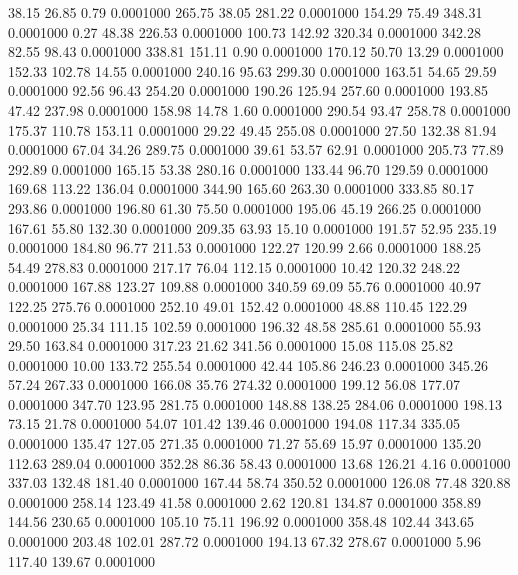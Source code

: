   38.15   26.85    0.79   0.0001000
 265.75   38.05  281.22   0.0001000
 154.29   75.49  348.31   0.0001000
   0.27   48.38  226.53   0.0001000
 100.73  142.92  320.34   0.0001000
 342.28   82.55   98.43   0.0001000
 338.81  151.11    0.90   0.0001000
 170.12   50.70   13.29   0.0001000
 152.33  102.78   14.55   0.0001000
 240.16   95.63  299.30   0.0001000
 163.51   54.65   29.59   0.0001000
  92.56   96.43  254.20   0.0001000
 190.26  125.94  257.60   0.0001000
 193.85   47.42  237.98   0.0001000
 158.98   14.78    1.60   0.0001000
 290.54   93.47  258.78   0.0001000
 175.37  110.78  153.11   0.0001000
  29.22   49.45  255.08   0.0001000
  27.50  132.38   81.94   0.0001000
  67.04   34.26  289.75   0.0001000
  39.61   53.57   62.91   0.0001000
 205.73   77.89  292.89   0.0001000
 165.15   53.38  280.16   0.0001000
 133.44   96.70  129.59   0.0001000
 169.68  113.22  136.04   0.0001000
 344.90  165.60  263.30   0.0001000
 333.85   80.17  293.86   0.0001000
 196.80   61.30   75.50   0.0001000
 195.06   45.19  266.25   0.0001000
 167.61   55.80  132.30   0.0001000
 209.35   63.93   15.10   0.0001000
 191.57   52.95  235.19   0.0001000
 184.80   96.77  211.53   0.0001000
 122.27  120.99    2.66   0.0001000
 188.25   54.49  278.83   0.0001000
 217.17   76.04  112.15   0.0001000
  10.42  120.32  248.22   0.0001000
 167.88  123.27  109.88   0.0001000
 340.59   69.09   55.76   0.0001000
  40.97  122.25  275.76   0.0001000
 252.10   49.01  152.42   0.0001000
  48.88  110.45  122.29   0.0001000
  25.34  111.15  102.59   0.0001000
 196.32   48.58  285.61   0.0001000
  55.93   29.50  163.84   0.0001000
 317.23   21.62  341.56   0.0001000
  15.08  115.08   25.82   0.0001000
  10.00  133.72  255.54   0.0001000
  42.44  105.86  246.23   0.0001000
 345.26   57.24  267.33   0.0001000
 166.08   35.76  274.32   0.0001000
 199.12   56.08  177.07   0.0001000
 347.70  123.95  281.75   0.0001000
 148.88  138.25  284.06   0.0001000
 198.13   73.15   21.78   0.0001000
  54.07  101.42  139.46   0.0001000
 194.08  117.34  335.05   0.0001000
 135.47  127.05  271.35   0.0001000
  71.27   55.69   15.97   0.0001000
 135.20  112.63  289.04   0.0001000
 352.28   86.36   58.43   0.0001000
  13.68  126.21    4.16   0.0001000
 337.03  132.48  181.40   0.0001000
 167.44   58.74  350.52   0.0001000
 126.08   77.48  320.88   0.0001000
 258.14  123.49   41.58   0.0001000
   2.62  120.81  134.87   0.0001000
 358.89  144.56  230.65   0.0001000
 105.10   75.11  196.92   0.0001000
 358.48  102.44  343.65   0.0001000
 203.48  102.01  287.72   0.0001000
 194.13   67.32  278.67   0.0001000
   5.96  117.40  139.67   0.0001000
